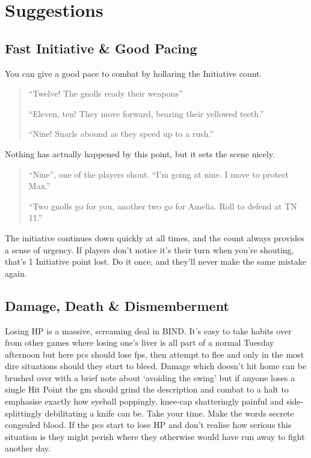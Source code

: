 \section{ Suggestions}

\begin{multicols}{2}

\subsection{Fast Initiative \& Good Pacing}

You can give a good pace to combat by hollaring the Initiative count.

\begin{quote}

``Twelve! The gnolls ready their weapons''

``Eleven, ten! They move forward, bearing their yellowed teeth.''

``Nine! Snarls abound as they speed up to a rush.''

\end{quote}

Nothing has actually happened by this point, but it sets the scene nicely.

\begin{quote}

``Nine'', one of the players shout.  ``I'm going at nine.  I move to protect Max.''

``Two gnolls go for you, another two go for Amelia.  Roll to defend at TN 11.''

\end{quote}

The initiative continues down quickly at all times, and the count always provides a sense of urgency.
If players don't notice it's their turn when you're shouting, that's 1 Initiative point lost.
Do it once, and they'll never make the same mistake again.

\subsection{Damage, Death \& Dismemberment}

Losing HP is a massive, screaming deal in BIND.
It's easy to take habits over from other games where losing one's liver is all part of a normal Tuesday afternoon but here \glspl{pc} should lose \glspl{fp}, then attempt to flee and only in the most dire situations should they start to bleed.
Damage which doesn't hit home can be brushed over with a brief note about `avoiding the swing' but if anyone loses a single Hit Point the \gls{gm} should grind the description and combat to a halt to emphasise exactly how eyeball poppingly, knee-cap shatteringly painful and side-splittingly debilitating a knife can be.
Take your time.
Make the words secrete congealed blood.
If the \glspl{pc} start to lose HP and don't realise how serious this situation is they might perish where they otherwise would have run away to fight another day.


\end{multicols}
